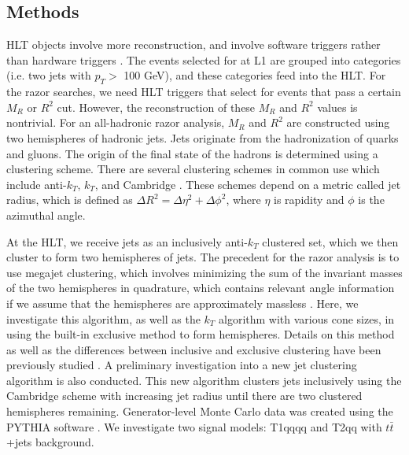 \documentclass[twocolumn,aps,prd,reprint]{revtex4-1}
\begin{document}
\subsection{Methods}
HLT objects involve more reconstruction, and involve software triggers rather than hardware triggers \cite{hlt}. The events selected for at L1 are grouped into categories (i.e. two jets with $p_{T} >$  100 GeV), and these categories feed into the HLT. For the razor searches, we need HLT triggers that select for events that pass a certain $M_R$ or $R^2$ cut. However, the reconstruction of these $M_R$ and $R^2$ values is nontrivial. For an all-hadronic razor analysis, $M_R$ and $R^2$ are constructed using two hemispheres of hadronic jets. Jets originate from the hadronization of quarks and gluons. The origin of the final state of the hadrons is determined using a clustering scheme. There are several clustering schemes in common use which include anti-$k_T$, $k_T$, and Cambridge \cite{fastjet}. These schemes depend on a metric called jet radius, which is defined as $\Delta R^2 = \Delta\eta^2+\Delta\phi^2$, where $\eta$ is rapidity and $\phi$ is the azimuthal angle.
\par At the HLT, we receive jets as an inclusively anti-$k_T$ clustered set, which we then cluster to form two hemispheres of jets. The precedent for the razor analysis is to use megajet clustering, which involves minimizing the sum of the invariant masses of the two hemispheres in quadrature, which contains relevant angle information if we assume that the hemispheres are approximately massless \cite{talk}. Here, we investigate this algorithm, as well as the $k_T$ algorithm with various cone sizes, in using the built-in exclusive method to form hemispheres. Details on this method as well as the differences between inclusive and exclusive clustering have been previously studied \cite{fastjet} . A preliminary investigation into a new jet clustering algorithm is also conducted. This new algorithm clusters jets inclusively using the Cambridge scheme with increasing jet radius until there are two clustered hemispheres remaining. Generator-level Monte Carlo data was created using the PYTHIA software \cite{pythia}. We investigate two signal models: T1qqqq and T2qq with $t\bar{t}$+jets background.
\end{document}

